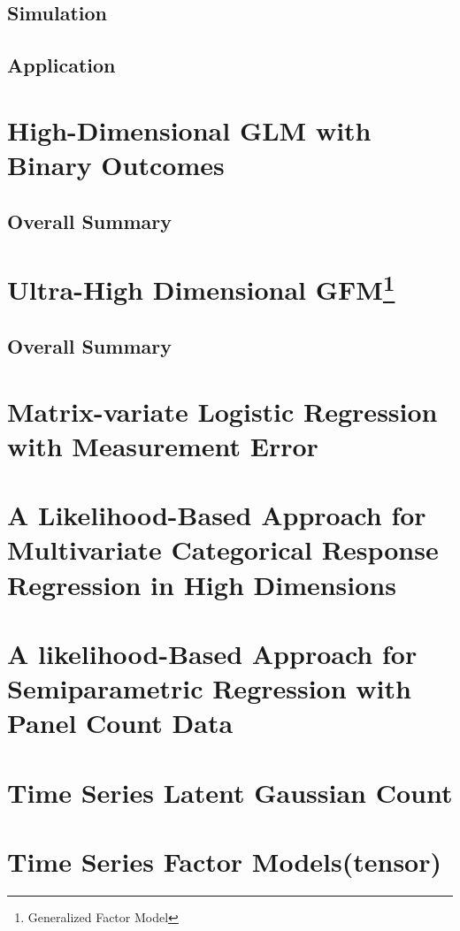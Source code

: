 \documentclass{article}[12pt]
\begin{document}
\subsection{Simulation}

\subsection{Application}
\section{High-Dimensional GLM with Binary Outcomes}
\subsection{Overall Summary}
\section [Ultra-High Dimensional GFM]{Ultra-High Dimensional GFM\footnote{Generalized Factor Model}} 
\subsection{Overall Summary} 

\section{Matrix-variate Logistic Regression with Measurement Error}
\section{A Likelihood-Based Approach for Multivariate Categorical Response Regression in High Dimensions}
\section{A likelihood-Based Approach for Semiparametric Regression with Panel Count Data}


\section{Time Series Latent Gaussian Count}
\section{Time Series Factor Models(tensor)}   
\end{document}
